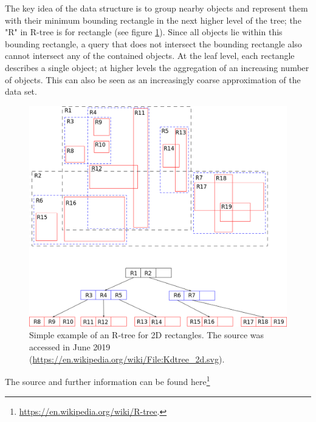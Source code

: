 \documentclass[12pt]{article}
\theoremstyle{plain}
\begin{document}
The key idea of the data structure is to group nearby objects and represent them with their minimum bounding rectangle in the next higher level of the tree; the "R" in R-tree is for rectangle (see figure \ref{rtree}). Since all objects lie within this bounding rectangle, a query that does not intersect the bounding rectangle also cannot intersect any of the contained objects. At the leaf level, each rectangle describes a single object; at higher levels the aggregation of an increasing number of objects. This can also be seen as an increasingly coarse approximation of the data set.

\begin{figure}[h!]
    \centering
	\includegraphics[width=.6\linewidth]{media/R-tree.png}
	\caption{Simple example of an R-tree for 2D rectangles. The source was accessed in June 2019 (\url{https://en.wikipedia.org/wiki/File:Kdtree_2d.svg}).}
	\label{rtree}
\end{figure}

%

The source and further information can be found here\footnote{\url{https://en.wikipedia.org/wiki/R-tree}.}


%

%

%

%



\end{document}
